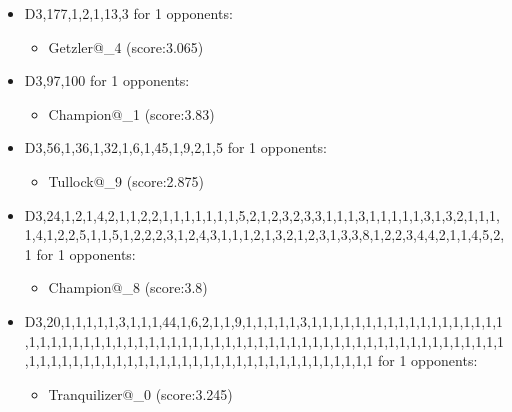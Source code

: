 \begin{appendices}
\begin{itemize}
        \item D3,177,1,2,1,13,3 for 1 opponents:
        \begin{multicols}{3}
            \begin{itemize}
                \item Getzler@\_4 (score:3.065)
            \end{itemize}
        \end{multicols}

        \item D3,97,100 for 1 opponents:
        \begin{multicols}{3}
            \begin{itemize}
                \item Champion@\_1 (score:3.83)
            \end{itemize}
        \end{multicols}

        \item D3,56,1,36,1,32,1,6,1,45,1,9,2,1,5 for 1 opponents:
        \begin{multicols}{3}
            \begin{itemize}
                \item Tullock@\_9 (score:2.875)
            \end{itemize}
        \end{multicols}

        \item D3,24,1,2,1,4,2,1,1,2,2,1,1,1,1,1,1,1,5,2,1,2,3,2,3,3,1,1,1,3,1,1,1,1,1,3,1,3,2,1,1,1,1,4,1,2,2,5,1,1,5,1,2,2,2,3,1,2,4,3,1,1,1,2,1,3,2,1,2,3,1,3,3,8,1,2,2,3,4,4,2,1,1,4,5,2,1 for 1 opponents:
        \begin{multicols}{3}
            \begin{itemize}
                \item Champion@\_8 (score:3.8)
            \end{itemize}
        \end{multicols}

        \item D3,20,1,1,1,1,1,3,1,1,1,44,1,6,2,1,1,9,1,1,1,1,1,3,1,1,1,1,1,1,1,1,1,1,1,1,1,1,1,1,1,1,1,1,1,1,1,1,1,1,1,1,1,1,1,1,1,1,1,1,1,1,1,1,1,1,1,1,1,1,1,1,1,1,1,1,1,1,1,1,1,1,1,1,1,1,1,1,1,1,1,1,1,1,1,1,1,1,1,1,1,1,1,1,1,1,1,1,1,1,1,1,1,1,1,1,1,1 for 1 opponents:
        \begin{multicols}{3}
            \begin{itemize}
                \item Tranquilizer@\_0 (score:3.245)
            \end{itemize}
        \end{multicols}


\end{itemize}
\end{appendices}

